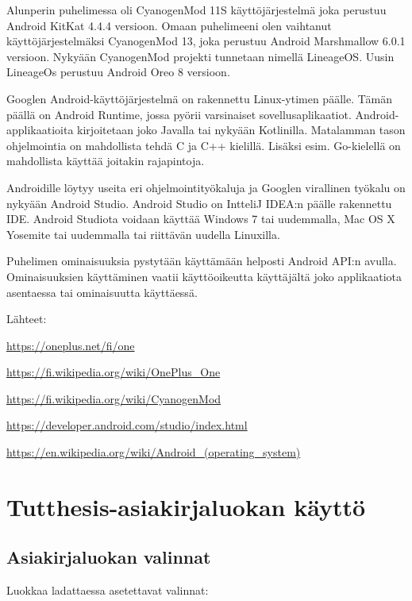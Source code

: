 \documentclass[globalnumbering,centeredcaptions,draftfooter]{tutthesis/tutthesis} %
\begin{document}
Alunperin puhelimessa oli CyanogenMod 11S käyttöjärjestelmä joka perustuu Android KitKat 4.4.4 versioon. Omaan puhelimeeni olen vaihtanut käyttöjärjestelmäksi CyanogenMod 13, joka perustuu Android Marshmallow 6.0.1 versioon. Nykyään CyanogenMod projekti tunnetaan nimellä LineageOS. Uusin LineageOs perustuu Android Oreo 8 versioon.

Googlen Android-käyttöjärjestelmä on rakennettu Linux-ytimen päälle. Tämän päällä on Android Runtime, jossa pyörii varsinaiset sovellusaplikaatiot. Android-applikaatioita kirjoitetaan joko Javalla tai nykyään Kotlinilla. Matalamman tason ohjelmointia on mahdollista tehdä C ja C++ kielillä. Lisäksi esim. Go-kielellä on mahdollista käyttää joitakin rajapintoja.

Androidille löytyy useita eri ohjelmointityökaluja ja Googlen virallinen työkalu on nykyään Android Studio. Android Studio on IntteliJ IDEA:n päälle rakennettu IDE. Android Studiota voidaan käyttää Windows 7 tai uudemmalla, Mac OS X Yosemite tai uudemmalla tai riittävän uudella Linuxilla.

Puhelimen ominaisuuksia pystytään käyttämään helposti Android API:n avulla. Ominaisuuksien käyttäminen vaatii käyttöoikeutta käyttäjältä joko applikaatiota asentaessa tai ominaisuutta käyttäessä.

Lähteet:

\url{https://oneplus.net/fi/one}

\url{https://fi.wikipedia.org/wiki/OnePlus_One}

\url{https://fi.wikipedia.org/wiki/CyanogenMod}

\url{https://developer.android.com/studio/index.html}

\url{https://en.wikipedia.org/wiki/Android_(operating_system)}

\chapter{Tutthesis-asiakirjaluokan käyttö}
\label{ch:classdocumentation}

\section{Asiakirjaluokan valinnat}

Luokkaa ladattaessa asetettavat valinnat:
\end{document}
